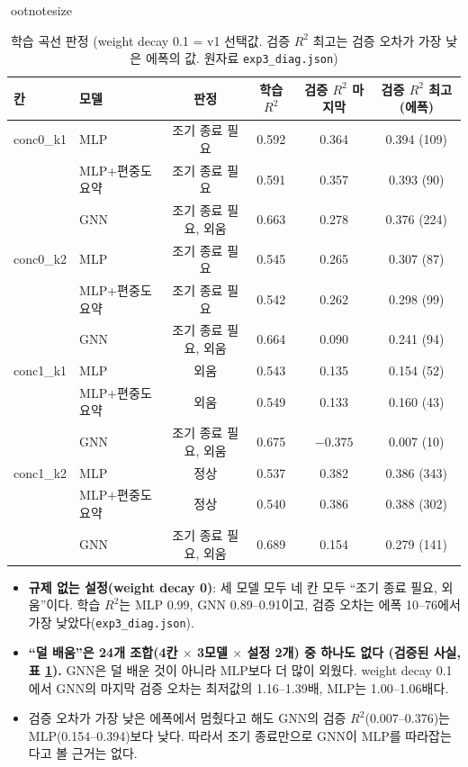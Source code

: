 \documentclass[11pt,a4paper]{article}
\begin{document}
\begin{table}[H]
\centeringootnotesize
\caption{학습 곡선 판정 (weight decay 0.1 = v1 선택값. 검증 $R^2$ 최고는 검증 오차가 가장 낮은 에폭의 값. 원자료 \texttt{exp3\_diag.json})}\label{tab:diag}
\begin{tabular}{llcccc}
\toprule
칸 & 모델 & 판정 & 학습 $R^2$ & 검증 $R^2$ 마지막 & 검증 $R^2$ 최고 (에폭)\\
\midrule
conc0\_k1 & MLP & 조기 종료 필요 & 0.592 & 0.364 & 0.394 (109)\\
 & MLP+편중도 요약 & 조기 종료 필요 & 0.591 & 0.357 & 0.393 (90)\\
 & GNN & 조기 종료 필요, 외움 & 0.663 & 0.278 & 0.376 (224)\\
\midrule
conc0\_k2 & MLP & 조기 종료 필요 & 0.545 & 0.265 & 0.307 (87)\\
 & MLP+편중도 요약 & 조기 종료 필요 & 0.542 & 0.262 & 0.298 (99)\\
 & GNN & 조기 종료 필요, 외움 & 0.664 & 0.090 & 0.241 (94)\\
\midrule
conc1\_k1 & MLP & 외움 & 0.543 & 0.135 & 0.154 (52)\\
 & MLP+편중도 요약 & 외움 & 0.549 & 0.133 & 0.160 (43)\\
 & GNN & 조기 종료 필요, 외움 & 0.675 & $-0.375$ & 0.007 (10)\\
\midrule
conc1\_k2 & MLP & 정상 & 0.537 & 0.382 & 0.386 (343)\\
 & MLP+편중도 요약 & 정상 & 0.540 & 0.386 & 0.388 (302)\\
 & GNN & 조기 종료 필요, 외움 & 0.689 & 0.154 & 0.279 (141)\\
\bottomrule
\end{tabular}
\end{table}

\begin{itemize}[leftmargin=1.5em]
  \item \textbf{규제 없는 설정(weight decay 0)}: 세 모델 모두 네 칸 모두 ``조기 종료 필요, 외움''이다. 학습 $R^2$는 MLP 0.99, GNN 0.89--0.91이고,
        검증 오차는 에폭 10--76에서 가장 낮았다(\texttt{exp3\_diag.json}).
  \item \textbf{``덜 배움''은 24개 조합(4칸 $\times$ 3모델 $\times$ 설정 2개) 중 하나도 없다 (검증된 사실, 표 \ref{tab:diag}).} GNN은 덜 배운 것이 아니라 MLP보다 더 많이 외웠다.
        weight decay 0.1에서 GNN의 마지막 검증 오차는 최저값의 1.16--1.39배, MLP는 1.00--1.06배다.
  \item 검증 오차가 가장 낮은 에폭에서 멈췄다고 해도 GNN의 검증 $R^2$(0.007--0.376)는 MLP(0.154--0.394)보다 낮다.
        따라서 조기 종료만으로 GNN이 MLP를 따라잡는다고 볼 근거는 없다.
\end{itemize}
\end{document}
